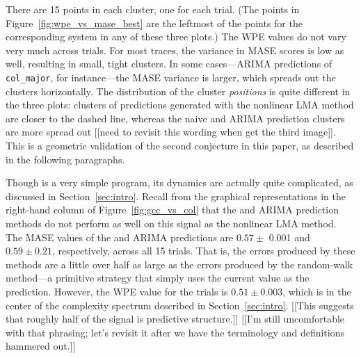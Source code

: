There are 15 points in each cluster, one for each trial.  (The points
in Figure~\ref{fig:wpe_vs_mase_best} are the leftmost of the points
for the corresponding system in any of these three plots.)  The WPE
values do not vary very much across trials.  For most traces, the
variance in MASE scores is low as well, resulting in small, tight
clusters.  In some cases---ARIMA predictions of {\tt col\_major}, for
instance---the MASE variance is larger, which spreads out the clusters
horizontally.  The distribution of the cluster {\sl positions} is
quite different in the three plots: clusters of predictions generated
with the nonlinear LMA method are closer to the dashed line, whereas
the naive and ARIMA prediction clusters are more spread out [[need to
    revisit this wording when get the third image]].  This is a
geometric validation of the second conjecture in this paper, as
described in the following paragraphs.

Though \col is a very simple program, its dynamics are actually quite
complicated, as discussed in Section~\ref{sec:intro}.  Recall from the
graphical representations in the right-hand column of
Figure~\ref{fig:gcc_vs_col} that the \naive and ARIMA prediction
methods do not perform as well on this signal as the nonlinear LMA
method.  The MASE values of the \naive and ARIMA predictions are $0.57
\pm$ 0.001 and $0.59 \pm 0.21$, respectively, across all 15 trials.
That is, the errors produced by these methods are a little over half
as large as the errors produced by the random-walk method---a
primitive strategy that simply uses the current value as the
prediction.  However, the WPE value for the \col trials is $0.51 \pm
0.003$, which is in the center of the complexity spectrum described in
Section~\ref{sec:intro}.  [[This suggests that roughly half of the
    signal is predictive structure.]]  [[I'm still uncomfortable with
    that phrasing; let's revisit it after we have the terminology and
    definitions hammered out.]]  

